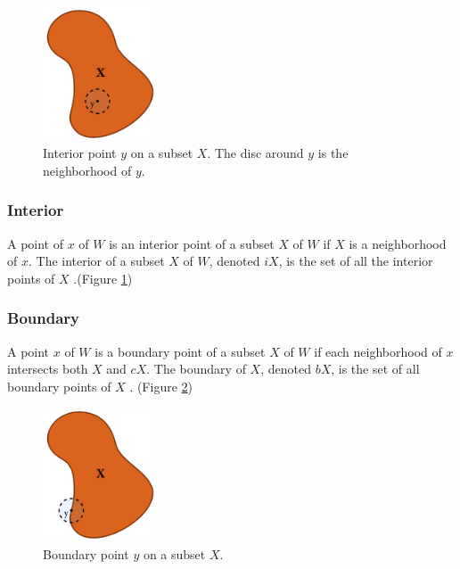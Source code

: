 \documentclass[a4paper,11pt,oneside]{article}
\begin{document}
\begin{figure}[ht]
	\begin{center}
		\includegraphics[width=0.3\textwidth]{section3/3.2/interior.png}
	\end{center}
	\caption{Interior point $y$ on a subset $X$. The disc around $y$ is the neighborhood of $y$.}
	\label{sec3.2:interior-neighborhood}
\end{figure}
    
\subsubsection{Interior}
     
\begin{definition}
	A point of $x$ of $W$ is an interior point of a subset $X$ of $W$ if $X$ is a neighborhood of $x$. The interior of a subset $X$ of $W$, denoted $iX$, is the set of all the interior points of $X$ \cite{Requicha1978MathematicalFO}.(Figure \ref{sec3.2:interior-neighborhood})
\end{definition}
    
\subsubsection{Boundary}
    
\begin{definition}
	A point $x$ of $W$ is a boundary point of a subset $X$ of $W$ if each neighborhood of $x$ intersects both $X$ and $cX$. The boundary of $X$, denoted $bX$, is the set of all boundary points of $X$ \cite{Requicha1978MathematicalFO}. (Figure \ref{sec3.2:boundary})
\end{definition}
    
\begin{figure}[ht]
	\begin{center}
		\includegraphics[width=0.3\textwidth]{section3/3.2/boundary.png}
	\end{center}
	\caption{Boundary point $y$ on a subset $X$.}
	\label{sec3.2:boundary}
\end{figure}
    
\end{document}
